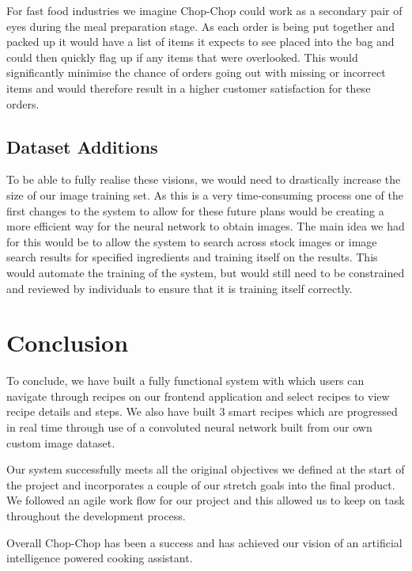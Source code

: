 \documentclass{article}
\begin{document}
For fast food industries we imagine Chop-Chop could work as a secondary pair of eyes during the meal preparation stage. As each order is being put together and packed up it would have a list of items it expects to see placed into the bag and could then quickly flag up if any items that were overlooked. This would significantly minimise the chance of orders going out with missing or incorrect items and would therefore result in a higher customer satisfaction for these orders.

\subsection{Dataset Additions}
To be able to fully realise these visions, we would need to drastically increase the size of our image training set. As this is a very time-consuming process one of the first changes to the system to allow for these future plans would be creating a more efficient way for the neural network to obtain images. The main idea we had for this would be to allow the system to search across stock images or image search results for specified ingredients and training itself on the results. This would automate the training of the system, but would still need to be constrained and reviewed by individuals to ensure that it is training itself correctly.

    \section{Conclusion}
    To conclude, we have built a fully functional system with which users can navigate through recipes on our frontend application and select recipes to view recipe details and steps. We also have built 3 smart recipes which are progressed in real time through use of a convoluted neural network built from our own custom image dataset.
    
    Our system successfully meets all the original objectives we defined at the start of the project and incorporates a couple of our stretch goals into the final product. We followed an agile work flow for our project and this allowed us to keep on task throughout the development process. 
    
    Overall Chop-Chop has been a success and has achieved our vision of an artificial intelligence powered cooking assistant.

\pagebreak







\end{document}
